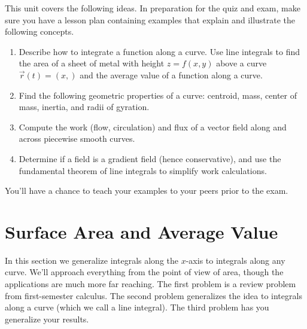 
\noindent 
This unit covers the following ideas. In preparation for the quiz and exam, make sure you have a lesson plan containing examples that explain and illustrate the following concepts.  
\begin{enumerate}
\item Describe how to integrate a function along a curve. Use line integrals to find the area of a sheet of metal with height $z=f(x,y)$ above a curve $\vec r(t)=\left(x,\right)$ and the average value of a function along a curve.
\item Find the following geometric properties of a curve: centroid, mass, center of mass, inertia, and radii of gyration.
\item Compute the work (flow, circulation) and flux of a vector field along and across piecewise smooth curves.
\item Determine if a field is a gradient field (hence conservative), and use the fundamental theorem of line integrals to simplify work calculations.
\end{enumerate}
You'll have a chance to teach your examples to your peers prior to the exam.

\section{Surface Area and Average Value}

In this section we generalize integrals along the $x$-axis to integrals along any curve. We'll approach everything from the point of view of area, though the applications are much more far reaching. The first problem is a review problem from first-semester calculus.  The second problem generalizes the idea to integrals along a curve (which we call a line integral). The third problem has you generalize your results.

